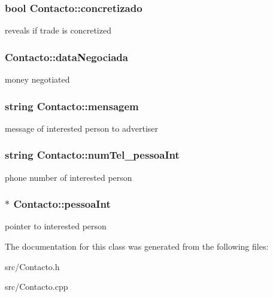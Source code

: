 \subsubsection[{concretizado}]{\setlength{\rightskip}{0pt plus 5cm}bool Contacto\+::concretizado\hspace{0.3cm}{\ttfamily [private]}}\label{class_contacto_abc6301a323bd9b2808f29370800d3aa1}
reveals if trade is concretized \hypertarget{class_contacto_aa228ef797c7b8338bed47ad7ec8680f9}{}
\subsubsection[{data\+Negociada}]{ Contacto\+::data\+Negociada\hspace{0.3cm}{\ttfamily [private]}}\label{class_contacto_aa228ef797c7b8338bed47ad7ec8680f9}
money negotiated \hypertarget{class_contacto_a5df8ad3ac8609cee665c21a2fa2a3e6a}{}
\subsubsection[{mensagem}]{\setlength{\rightskip}{0pt plus 5cm}string Contacto\+::mensagem\hspace{0.3cm}{\ttfamily [private]}}\label{class_contacto_a5df8ad3ac8609cee665c21a2fa2a3e6a}
message of interested person to advertiser \hypertarget{class_contacto_a87b5fa8d59ad7b8596eb1d48bfb405df}{}
\subsubsection[{num\+Tel\+\_\+pessoa\+Int}]{\setlength{\rightskip}{0pt plus 5cm}string Contacto\+::num\+Tel\+\_\+pessoa\+Int\hspace{0.3cm}{\ttfamily [private]}}\label{class_contacto_a87b5fa8d59ad7b8596eb1d48bfb405df}
phone number of interested person \hypertarget{class_contacto_a30bc3e0baecefc67118e591858b5da4c}{}
\subsubsection[{pessoa\+Int}]{$\ast$ Contacto\+::pessoa\+Int\hspace{0.3cm}{\ttfamily [private]}}\label{class_contacto_a30bc3e0baecefc67118e591858b5da4c}
pointer to interested person 

The documentation for this class was generated from the following files\+:\begin{DoxyCompactItemize}
\item 
src/Contacto.\+h\item 
src/Contacto.\+cpp\end{DoxyCompactItemize}
